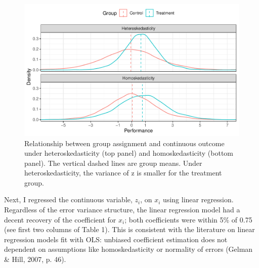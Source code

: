 \documentclass[
  english,
  doc]{apa6}
\begin{document}
\begin{figure}
\centering
\includegraphics{dicho_het_log_files/figure-latex/fig1-1.pdf}
\caption{\label{fig:fig1}Relationship between group assignment and continuous outcome under heteroskedasticity (top panel) and homoskedasticity (bottom panel). The vertical dashed lines are group means. Under heteroskedasticity, the variance of z is smaller for the treatment group.}
\end{figure}

Next, I regressed the continuous variable, \(z_i\), on \(x_i\) using linear regression. Regardless of the error variance structure, the linear regression model had a decent recovery of the coefficient for \(x_i\); both coefficients were within 5\% of 0.75 (see first two columns of Table 1). This is consistent with the literature on linear regression models fit with OLS: unbiased coefficient estimation does not dependent on assumptions like homoskedasticity or normality of errors (Gelman \& Hill, 2007, p. 46).
\end{document}
